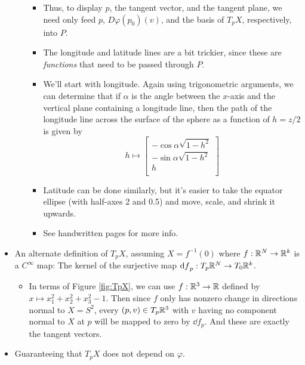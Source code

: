 \documentclass[../notes.tex]{subfiles}
\begin{document}
\begin{itemize}
\begin{itemize}
\begin{itemize}
            \item Thus, to display $p$, the tangent vector, and the tangent plane, we need only feed $p$, $D\varphi(p_0)(v)$, and the basis of $T_pX$, respectively, into $P$.
            \item The longitude and latitude lines are a bit trickier, since these are \emph{functions} that need to be passed through $P$.\par
            \item We'll start with longitude. Again using trigonometric arguments, we can determine that if $\alpha$ is the angle between the $x$-axis and the vertical plane containing a longitude line, then the path of the longitude line across the surface of the sphere as a function of $h=z/2$ is given by
            \begin{equation*}
                h \mapsto
                \begin{bmatrix}
                    -\cos\alpha\sqrt{1-h^2}\\
                    -\sin\alpha\sqrt{1-h^2}\\
                    h\\
                \end{bmatrix}
            \end{equation*}
            \item Latitude can be done similarly, but it's easier to take the equator ellipse (with half-axes 2 and 0.5) and move, scale, and shrink it upwards.
            \item See handwritten pages for more info.
        \end{itemize}
    \end{itemize}
    \item An alternate definition of $T_pX$, assuming $X=f^{-1}(0)$ where $f:\mathbb{R}^N\to\mathbb{R}^k$ is a $C^\infty$ map: The kernel of the surjective map $\dd{f}_p:T_p\mathbb{R}^N\to T_0\mathbb{R}^k$.
    \begin{itemize}
        \item In terms of Figure \ref{fig:TpX}, we can use $f:\mathbb{R}^3\to\mathbb{R}$ defined by $x\mapsto x_1^2+x_2^2+x_3^2-1$. Then since $f$ only has nonzero change in directions normal to $X=S^2$, every $(p,v)\in T_p\mathbb{R}^3$ with $v$ having no component normal to $X$ at $p$ will be mapped to zero by $\dd{f}_p$. And these are exactly the tangent vectors.
    \end{itemize}
    \item Guaranteeing that $T_pX$ does not depend on $\varphi$.
    \begin{itemize}

\end{itemize}
\end{itemize}
\end{document}

